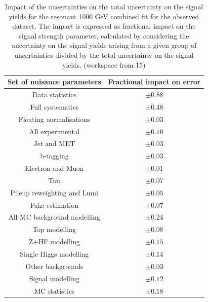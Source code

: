\begin{table}
\centering
\begin{tabular}{|c|c|}
\hline
Set of nuisance parameters & Fractional impact on error\\
\hline
Data statistics & $\pm 0.88$\\
Full systematics & $\pm 0.48$\\
\hline
Floating normalisations & $\pm 0.03$ \\
\hline
All experimental &$\pm 0.10$ \\
Jet and MET & $\pm 0.03$ \\
b-tagging & $\pm 0.03$\\
Electron and Muon & $\pm 0.01$\\
Tau & $\pm0.07$\\
Pileup reweighting and Lumi & $\pm 0.05$\\
\hline
Fake estimation & $\pm 0.07$\\
\hline
All MC background modelling & $\pm 0.24$  \\
Top modelling & $\pm 0.08$\\ 
Z+HF modelling & $\pm 0.15$\\
Single Higgs modelling & $\pm 0.14$\\
Other backgrounds & $\pm 0.03$\\
\hline
Signal modelling & $\pm 0.12$\\
\hline
MC statistics & $\pm 0.18$\\
\hline
\end{tabular}
\caption{Impact of the uncertainties on the total uncertainty on the signal yields for the resonant 1000 GeV combined fit for the observed dataset.  The impact is expressed as fractional impact on the signal strength parameter,  calculated by considering the uncertainty on the signal yields arising from a given group of uncertainties divided by the total uncertainty on the signal yields.  (workspace from 15)}
\label{sec:fit:tab:CombBreakdown2HDM1000Observed}
\end{table}


